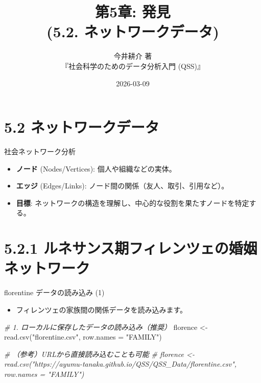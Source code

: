 \documentclass[
  ignorenonframetext,
]{beamer}
\title{第5章: 発見\\
(5.2. ネットワークデータ)}
\subtitle{今井耕介 著\\
『社会科学のためのデータ分析入門 (QSS)』}
\author{}
\date{\vspace{-2.5em}2026-03-09}
\newenvironment{Shaded}{\begin{snugshade}}{\end{snugshade}}
\newcommand{\AttributeTok}[1]{\textcolor[rgb]{0.77,0.63,0.00}{#1}}
\newcommand{\CommentTok}[1]{\textcolor[rgb]{0.56,0.35,0.01}{\textit{#1}}}
\newcommand{\FunctionTok}[1]{\textcolor[rgb]{0.00,0.00,0.00}{#1}}
\newcommand{\NormalTok}[1]{#1}
\newcommand{\OtherTok}[1]{\textcolor[rgb]{0.56,0.35,0.01}{#1}}
\newcommand{\StringTok}[1]{\textcolor[rgb]{0.31,0.60,0.02}{#1}}
\providecommand{\tightlist}{%
  \setlength{\itemsep}{0pt}\setlength{\parskip}{0pt}}
\begin{document}
\frame{\titlepage}

\hypertarget{ux30cdux30c3ux30c8ux30efux30fcux30afux30c7ux30fcux30bf}{%
\section{5.2
ネットワークデータ}\label{ux30cdux30c3ux30c8ux30efux30fcux30afux30c7ux30fcux30bf}}

\begin{frame}{社会ネットワーク分析}
\protect\hypertarget{ux793eux4f1aux30cdux30c3ux30c8ux30efux30fcux30afux5206ux6790}{}
\begin{itemize}
\tightlist
\item
  \textbf{ノード} (Nodes/Vertices): 個人や組織などの実体。
\item
  \textbf{エッジ} (Edges/Links):
  ノード間の関係（友人、取引、引用など）。
\item
  \textbf{目標}:
  ネットワークの構造を理解し、中心的な役割を果たすノードを特定する。
\end{itemize}
\end{frame}

\hypertarget{ux30ebux30cdux30b5ux30f3ux30b9ux671fux30d5ux30a3ux30ecux30f3ux30c4ux30a7ux306eux5a5aux59fbux30cdux30c3ux30c8ux30efux30fcux30af}{%
\section{5.2.1
ルネサンス期フィレンツェの婚姻ネットワーク}\label{ux30ebux30cdux30b5ux30f3ux30b9ux671fux30d5ux30a3ux30ecux30f3ux30c4ux30a7ux306eux5a5aux59fbux30cdux30c3ux30c8ux30efux30fcux30af}}

\begin{frame}[fragile]{florentine データの読み込み (1)}
\protect\hypertarget{florentine-ux30c7ux30fcux30bfux306eux8aadux307fux8fbcux307f-1}{}
\begin{itemize}
\tightlist
\item
  フィレンツェの家族間の関係データを読み込みます。
\end{itemize}

\scriptsize

\begin{Shaded}
\begin{Highlighting}[]
\CommentTok{\# 1. ローカルに保存したデータの読み込み（推奨）}
\NormalTok{florence }\OtherTok{\textless{}{-}} \FunctionTok{read.csv}\NormalTok{(}\StringTok{"florentine.csv"}\NormalTok{, }\AttributeTok{row.names =} \StringTok{"FAMILY"}\NormalTok{)}

\CommentTok{\# （参考）URLから直接読み込むことも可能}
\CommentTok{\# florence \textless{}{-} read.csv("https://ayumu{-}tanaka.github.io/QSS/QSS\_Data/florentine.csv", row.names = "FAMILY")}
\end{Highlighting}
\end{Shaded}

\normalsize
\end{frame}
\end{document}
